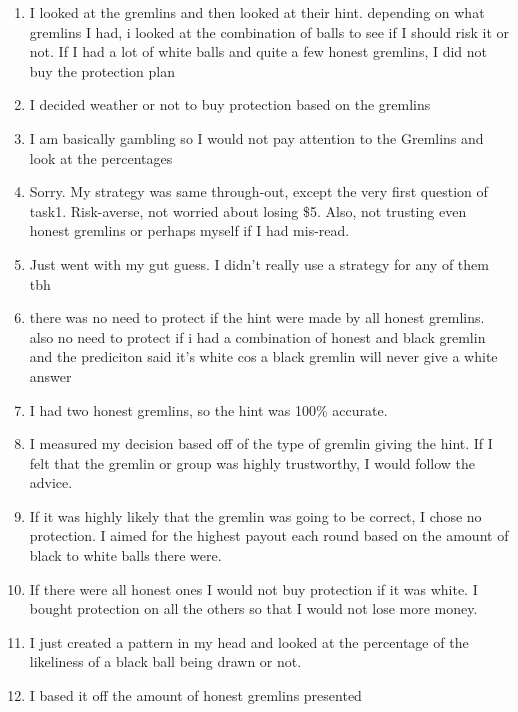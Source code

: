 \documentclass[12pt,a4paper]{article}
\begin{document}
\begin{appendices}
\begin{enumerate}
\item I looked at the gremlins and then looked at their hint. depending on what gremlins I had, i looked at the combination of balls to see if I should risk it or not. If I had a lot of white balls and quite a few honest gremlins, I did not buy the protection plan

\item I decided weather or not to buy protection based on the gremlins

\item I am basically gambling so I would not pay attention to the Gremlins and look at the percentages

\item Sorry. My strategy was same through-out, except the very first question of task1. Risk-averse, not worried about losing \$5. Also, not trusting even honest gremlins or perhaps myself if I had mis-read.

\item Just went with my gut guess. I didn't really use a strategy for any of them tbh

\item there was no need to protect if the hint were made by all honest gremlins. also no need to protect if i had a combination of honest and black gremlin and the prediciton said it's white cos a black gremlin will never give a white answer

\item I had two honest gremlins, so the hint was 100\% accurate.

\item I measured my decision based off of the type of gremlin giving the hint. If I felt that the gremlin or group was highly trustworthy, I would follow the advice.

\item If it was highly likely that the gremlin was going to be correct, I chose no protection. I aimed for the highest payout each round based on the amount of black to white balls there were.

\item If there were all honest ones I would not buy protection if it was white. I bought protection on all the others so that I would not lose more money.

\item I just created a pattern in my head and looked at the percentage of the likeliness of a black ball being drawn or not.

\item I based it off the amount of honest gremlins presented


\end{enumerate}
\end{appendices}
\end{document}
